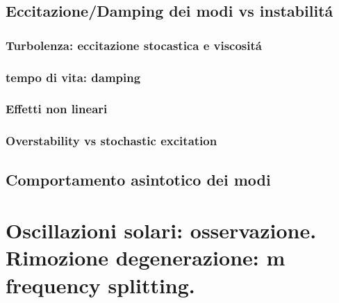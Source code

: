 \documentclass[../main.tex]{subfiles}
\begin{document}
\begin{refsection}

\section{Eccitazione/Damping dei modi vs instabilit\'a}

\subsection{Turbolenza: eccitazione stocastica e viscosit\'a}
\subsection{tempo di vita: damping}
\subsection{Effetti non lineari}
\subsection{Overstability vs stochastic excitation}

\section{Comportamento asintotico dei modi}

\end{refsection}


{\let\clearpage\relax
\chapter{Oscillazioni solari: osservazione. Rimozione degenerazione: m frequency splitting.}}
\PartialToc
\end{document}
